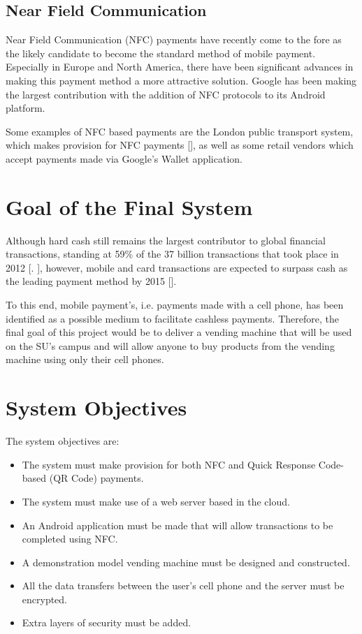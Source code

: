 \subsection{Near Field Communication}

Near Field Communication (NFC) payments have recently come to the fore as the likely
candidate to become the standard method of mobile payment. Especially in Europe and North
America, there have been significant advances in making this payment method a more
attractive solution.
Google has been making the largest contribution with the addition of NFC protocols to its
Android platform.

Some examples of NFC based payments are the London public transport system, which makes
provision for NFC payments [\cite{article:nfc-underground}], as well as some retail vendors
which accept payments made via Google's Wallet application.

\section{Goal of the Final System}
\label{sec:final-system-goal}

Although hard cash still remains the largest contributor to global financial transactions,
standing at 59\% of the 37 billion transactions that took place in 2012
[\cite{article:money-transactions}. \cite{website:money-transactions}], however, mobile
and card transactions are expected to surpass cash as the leading payment method by 2015
[\cite{article:cashless-transactions}].

To this end, mobile payment's, i.e. payments made with a cell phone, has been identified
as a possible medium to facilitate cashless payments. Therefore, the final goal of this
project would be to deliver a vending machine that will be used on the
SU's campus and will allow anyone to buy products from the vending machine using only
their cell phones.

\section{System Objectives}
\label{sec:objectives}

The system objectives are:

\begin{itemize}
  \item The system must make provision for both NFC and Quick Response Code-based (QR
  Code) payments.
  \item The system must make use of a web server based in the cloud.
  \item An Android application must be made that will allow transactions to be completed
  using NFC.
  \item A demonstration model vending machine must be designed and constructed.
  \item All the data transfers between the user's cell phone and the server must be
  encrypted.
  \item Extra layers of security must be added. 
\end{itemize}

